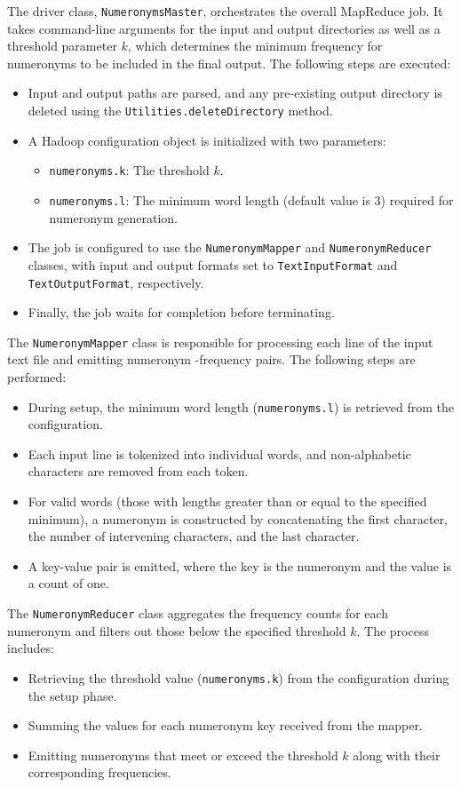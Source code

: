 \documentclass[acmlarge]{acmart}
\begin{document}
The driver class, \texttt{NumeronymsMaster}, orchestrates the overall MapReduce job.
It takes command-line arguments for the input and output directories as well as a threshold parameter $k$, which
determines the minimum frequency for numeronyms to be included in the final output.
The following steps are executed:
\begin{itemize}
  \item Input and output paths are parsed, and any pre-existing output directory is deleted using the
        \texttt{Utilities.deleteDirectory} method.
  \item A Hadoop configuration object is initialized with two parameters:
        \begin{itemize}
          \item \texttt{numeronyms.k}: The threshold $k$.
          \item \texttt{numeronyms.l}: The minimum word length (default value is 3) required for numeronym generation.
        \end{itemize}
  \item The job is configured to use the \texttt{NumeronymMapper} and \texttt{NumeronymReducer} classes, with input and
        output formats set to \texttt{TextInputFormat} and \texttt{TextOutputFormat}, respectively.
  \item Finally, the job waits for completion before terminating.
\end{itemize}

The \texttt{NumeronymMapper} class is responsible for processing each line of the input text file and emitting numeronym
-frequency pairs.
The following steps are performed:
\begin{itemize}
  \item During setup, the minimum word length (\texttt{numeronyms.l}) is retrieved from the configuration.
  \item Each input line is tokenized into individual words, and non-alphabetic characters are removed from each token.
  \item For valid words (those with lengths greater than or equal to the specified minimum), a numeronym is constructed
        by concatenating the first character, the number of intervening characters, and the last character.
  \item A key-value pair is emitted, where the key is the numeronym and the value is a count of one.
\end{itemize}

The \texttt{NumeronymReducer} class aggregates the frequency counts for each numeronym and filters out those below the
specified threshold $k$.
The process includes:
\begin{itemize}
  \item Retrieving the threshold value (\texttt{numeronyms.k}) from the configuration during the setup phase.
  \item Summing the values for each numeronym key received from the mapper.
  \item Emitting numeronyms that meet or exceed the threshold $k$ along with their corresponding frequencies.
\end{itemize}
\end{document}
